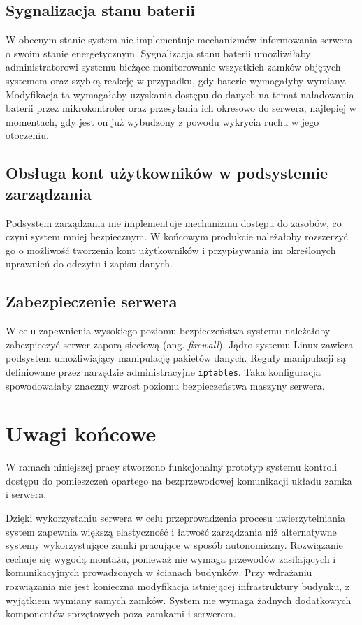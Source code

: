         \subsection{Sygnalizacja stanu baterii}

            W obecnym stanie system nie implementuje mechanizmów informowania serwera o swoim stanie energetycznym.
            Sygnalizacja stanu baterii umożliwiłaby administratorowi systemu bieżące monitorowanie wszystkich zamków objętych systemem oraz szybką reakcję w przypadku, gdy baterie wymagałyby wymiany. Modyfikacja ta wymagałaby uzyskania dostępu do danych na temat naładowania baterii przez mikrokontroler oraz przesyłania ich okresowo do serwera, najlepiej w momentach, gdy jest on już wybudzony z powodu wykrycia ruchu w jego otoczeniu.

        \subsection{Obsługa kont użytkowników w podsystemie zarządzania}

            Podsystem zarządzania nie implementuje mechanizmu dostępu do zasobów, co czyni system mniej bezpiecznym. W końcowym produkcie należałoby rozszerzyć go o możliwość tworzenia kont użytkowników i przypisywania im określonych uprawnień do odczytu i zapisu danych.

        \subsection{Zabezpieczenie serwera}

            W celu zapewnienia wysokiego poziomu bezpieczeństwa systemu należałoby zabezpieczyć serwer zaporą sieciową (ang. \textit{firewall}). Jądro systemu Linux zawiera podsystem umożliwiający manipulację pakietów danych. Reguły manipulacji są definiowane przez narzędzie administracyjne \texttt{iptables}. Taka konfiguracja spowodowałaby znaczny wzrost poziomu bezpieczeństwa maszyny serwera.


    \section{Uwagi końcowe}

        W ramach niniejszej pracy stworzono funkcjonalny prototyp systemu kontroli dostępu do pomieszczeń opartego na bezprzewodowej komunikacji układu zamka i serwera.

        Dzięki wykorzystaniu serwera w celu przeprowadzenia procesu uwierzytelniania system zapewnia większą elastyczność i łatwość zarządzania niż alternatywne systemy wykorzystujące zamki pracujące w sposób autonomiczny. Rozwiązanie cechuje się wygodą montażu, ponieważ nie wymaga przewodów zasilających i komunikacyjnych prowadzonych w ścianach budynków. Przy wdrażaniu rozwiązania nie jest konieczna modyfikacja istniejącej infrastruktury budynku, z wyjątkiem wymiany samych zamków. System nie wymaga żadnych dodatkowych komponentów sprzętowych poza zamkami i serwerem.

